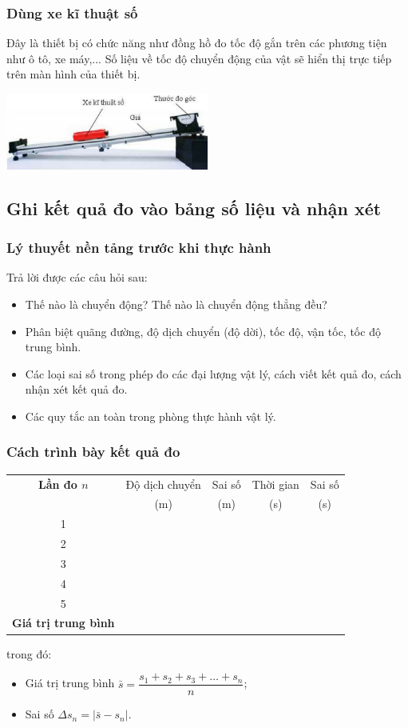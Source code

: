 \subsubsection{Dùng xe kĩ thuật số}
Đây là thiết bị có chức năng như đồng hồ đo tốc độ gắn trên các phương tiện như ô tô, xe máy,... Số liệu về tốc độ chuyển động của vật sẽ hiển thị trực tiếp trên màn hình của thiết bị.
\begin{center}
	\includegraphics[width=0.5\textwidth]{../figs/G10-4-2}
\end{center}
\subsection{Ghi kết quả đo vào bảng số liệu và nhận xét}
\subsubsection{Lý thuyết nền tảng trước khi thực hành}
Trả lời được các câu hỏi sau:
\begin{itemize}
	\item Thế nào là chuyển động? Thế nào là chuyển động thẳng đều?
	\item Phân biệt quãng đường, độ dịch chuyển (độ dời), tốc độ, vận tốc, tốc độ trung bình.
	\item Các loại sai số trong phép đo các đại lượng vật lý, cách viết kết quả đo, cách nhận xét kết quả đo.
	\item Các quy tắc an toàn trong phòng thực hành vật lý.
\end{itemize}
\subsubsection{Cách trình bày kết quả đo}

\begin{center}
	\vspace{5pt}
	\begin{tabular}{|c|c|c|c|c|}
		\hline
		\textbf{Lần đo $n$}& Độ dịch chuyển & Sai số & Thời gian & Sai số\\
		&(m)&(m)&(s)&(s)\\
		\hline
		1&&&&\\
		\hline
		2&&&&\\
		\hline
		3&&&&\\
		\hline
		4&&&&\\
		\hline
		5&&&&\\
		\hline
		\textbf{Giá trị trung bình }&&&&\\
		\hline
	\end{tabular}
\end{center}
trong đó:
\begin{itemize}
	\item Giá trị trung bình $\bar{s} = \dfrac{s_1 + s_2 + s_3 + \ldots + s_n}{n}$;
	\item Sai số $\Delta s_n = |\bar{s} - s_n|$. 
\end{itemize}

